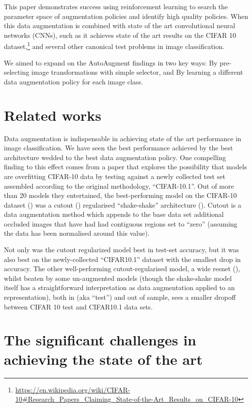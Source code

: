 \documentclass[10pt,twocolumn,letterpaper]{article}
\begin{document}
  This paper demonstrates success using reinforcement learning to search the parameter space of augmentation policies and identify high quality policies. When this data augmentation is combined with state of the art convolutional neural networks (CNNs), such as \cite{Yamada2018} it achieves state of the art results on the CIFAR 10 dataset,\footnote{\url{https://en.wikipedia.org/wiki/CIFAR-10\#Research\_Papers\_Claiming\_State-of-the-Art\_Results\_on\_CIFAR-10}} and several other canonical test problems in image classification.

  We aimed to expand on the AutoAugment findings in two key ways:
  By pre-selecting image transformations with simple selector, and
  By learning a different data augmentation policy for each image class.

\section{Related works}

  Data augmentation is indispensable in achieving state of the art performance in image classification. We have seen the best performance achieved by the best architecture wedded to the best data augmentation policy. One compelling finding to this effect comes from a paper that explores the possibility that models are overfitting CIFAR-10 data \cite{Recht2018} by testing against a newly collected test set assembled according to the original methodology, ``CIFAR-10.1''. Out of more than 20 models they entertained, the best-performing model on the CIFAR-10 dataset (\cite{Krizhevsky2009}) was a cutout (\cite{Devries2017}) regularised ``shake-shake'' architecture (\cite{Gastaldi2017}). Cutout is a data augmentation method which appends to the base data set additional occluded images that have had had contiguous regions set to ``zero'' (assuming the data has been normalised around this value).

  Not only was the cutout regularized model best in test-set accuracy, but it was also best on the newly-collected ``CIFAR10.1'' dataset \cite{Recht2018} with the smallest drop in accuracy. The other well-performing cutout-regularised model, a wide resnet (\cite{Zagoruyko2016}), whilst beaten by some un-augmented models (though the shake-shake model itself has a straightforward interpretation as data augmentation applied to an representation), both in (aka ``test'') and out of sample, sees a smaller dropoff between CIFAR 10 test and CIFAR10.1 data sets.

\section{The significant challenges in achieving the state of the art}
\end{document}

